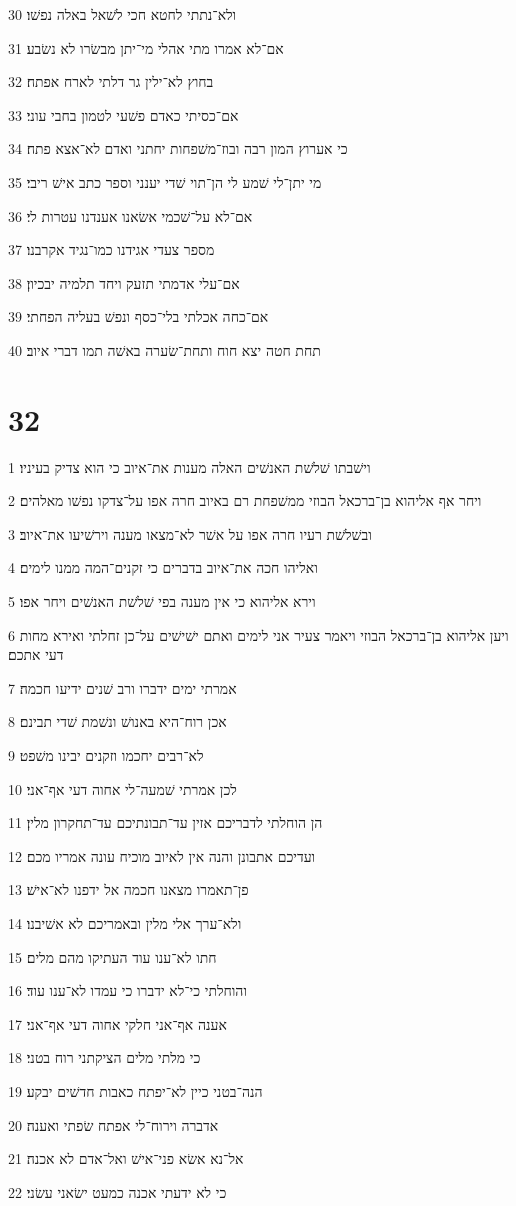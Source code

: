 \par 30 ולא־נתתי לחטא חכי לשׁאל באלה נפשׁו׃
\par 31 אם־לא אמרו מתי אהלי מי־יתן מבשׂרו לא נשׂבע׃
\par 32 בחוץ לא־ילין גר דלתי לארח אפתח׃
\par 33 אם־כסיתי כאדם פשׁעי לטמון בחבי עוני׃
\par 34 כי אערוץ המון רבה ובוז־משׁפחות יחתני ואדם לא־אצא פתח׃
\par 35 מי יתן־לי שׁמע לי הן־תוי שׁדי יענני וספר כתב אישׁ ריבי׃
\par 36 אם־לא על־שׁכמי אשׂאנו אענדנו עטרות לי׃
\par 37 מספר צעדי אגידנו כמו־נגיד אקרבנו׃
\par 38 אם־עלי אדמתי תזעק ויחד תלמיה יבכיון׃
\par 39 אם־כחה אכלתי בלי־כסף ונפשׁ בעליה הפחתי׃
\par 40 תחת חטה יצא חוח ותחת־שׂערה באשׁה תמו דברי איוב׃

\chapter{32}

\par 1 וישׁבתו שׁלשׁת האנשׁים האלה מענות את־איוב כי הוא צדיק בעיניו׃
\par 2 ויחר אף אליהוא בן־ברכאל הבוזי ממשׁפחת רם באיוב חרה אפו על־צדקו נפשׁו מאלהים׃
\par 3 ובשׁלשׁת רעיו חרה אפו על אשׁר לא־מצאו מענה וירשׁיעו את־איוב׃
\par 4 ואליהו חכה את־איוב בדברים כי זקנים־המה ממנו לימים׃
\par 5 וירא אליהוא כי אין מענה בפי שׁלשׁת האנשׁים ויחר אפו׃
\par 6 ויען אליהוא בן־ברכאל הבוזי ויאמר צעיר אני לימים ואתם ישׁישׁים על־כן זחלתי ואירא מחות דעי אתכם׃
\par 7 אמרתי ימים ידברו ורב שׁנים ידיעו חכמה׃
\par 8 אכן רוח־היא באנושׁ ונשׁמת שׁדי תבינם׃
\par 9 לא־רבים יחכמו וזקנים יבינו משׁפט׃
\par 10 לכן אמרתי שׁמעה־לי אחוה דעי אף־אני׃
\par 11 הן הוחלתי לדבריכם אזין עד־תבונתיכם עד־תחקרון מלין׃
\par 12 ועדיכם אתבונן והנה אין לאיוב מוכיח עונה אמריו מכם׃
\par 13 פן־תאמרו מצאנו חכמה אל ידפנו לא־אישׁ׃
\par 14 ולא־ערך אלי מלין ובאמריכם לא אשׁיבנו׃
\par 15 חתו לא־ענו עוד העתיקו מהם מלים׃
\par 16 והוחלתי כי־לא ידברו כי עמדו לא־ענו עוד׃
\par 17 אענה אף־אני חלקי אחוה דעי אף־אני׃
\par 18 כי מלתי מלים הציקתני רוח בטני׃
\par 19 הנה־בטני כיין לא־יפתח כאבות חדשׁים יבקע׃
\par 20 אדברה וירוח־לי אפתח שׂפתי ואענה׃
\par 21 אל־נא אשׂא פני־אישׁ ואל־אדם לא אכנה׃
\par 22 כי לא ידעתי אכנה כמעט ישׂאני עשׂני׃

